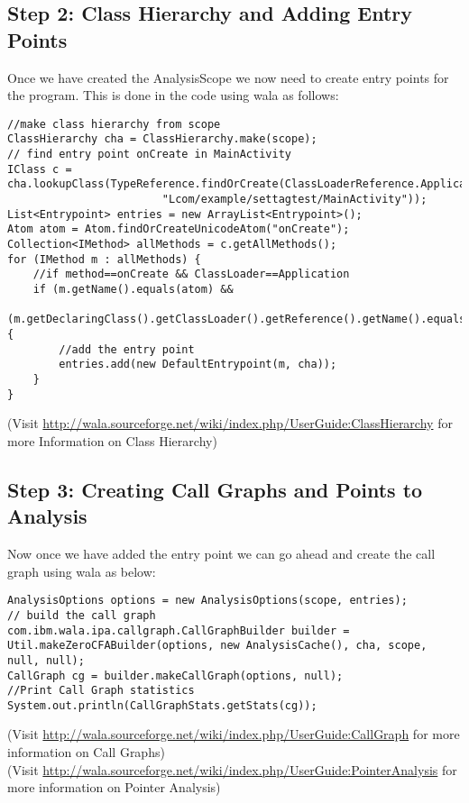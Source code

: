 \documentclass[11pt,psfig,a4]{article}
\begin{document}
\begin{flushleft}
\subsection{Step 2: Class Hierarchy and Adding Entry Points}
Once we have created the AnalysisScope we now need to create entry points for the program. This is done in the code using wala as follows: \\
\begin{lstlisting}
//make class hierarchy from scope
ClassHierarchy cha = ClassHierarchy.make(scope);
// find entry point onCreate in MainActivity
IClass c = cha.lookupClass(TypeReference.findOrCreate(ClassLoaderReference.Application,
						"Lcom/example/settagtest/MainActivity"));
List<Entrypoint> entries = new ArrayList<Entrypoint>();
Atom atom = Atom.findOrCreateUnicodeAtom("onCreate");
Collection<IMethod> allMethods = c.getAllMethods();
for (IMethod m : allMethods) {
	//if method==onCreate && ClassLoader==Application
	if (m.getName().equals(atom) && 
	   (m.getDeclaringClass().getClassLoader().getReference().getName().equals(Atom.findOrCreateUnicodeAtom("Application")))) {
		//add the entry point
		entries.add(new DefaultEntrypoint(m, cha));
	}
}
\end{lstlisting}
(Visit \url{http://wala.sourceforge.net/wiki/index.php/UserGuide:ClassHierarchy} for more Information on Class Hierarchy)\\
\subsection{Step 3: Creating Call Graphs and Points to Analysis}
Now once we have added the entry point we can go ahead and create the call graph using wala as below:
\begin{lstlisting}
AnalysisOptions options = new AnalysisOptions(scope, entries);
// build the call graph
com.ibm.wala.ipa.callgraph.CallGraphBuilder builder = Util.makeZeroCFABuilder(options, new AnalysisCache(), cha, scope, null, null);
CallGraph cg = builder.makeCallGraph(options, null);
//Print Call Graph statistics
System.out.println(CallGraphStats.getStats(cg));
\end{lstlisting}
(Visit \url{http://wala.sourceforge.net/wiki/index.php/UserGuide:CallGraph} for more information on Call Graphs)\\
(Visit \url{http://wala.sourceforge.net/wiki/index.php/UserGuide:PointerAnalysis} for more information on Pointer Analysis)\\

\end{flushleft}
\end{document}
